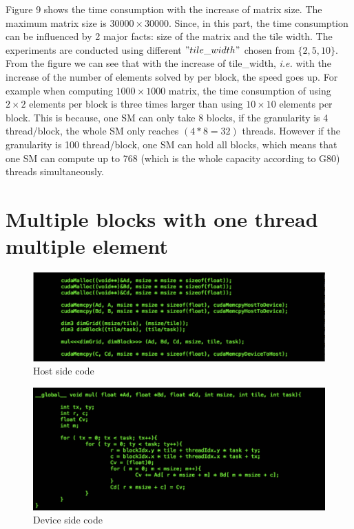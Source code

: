 \documentclass {article}
\begin{document}
Figure 9 shows the time consumption with the increase of matrix size. The maximum matrix size is $30000\times 30000$. Since, in this part, the time consumption can be influenced by 2 major facts: size of the matrix and the tile width. The experiments are conducted using different $"tile\_width"$ chosen from $\{2, 5, 10\}$. From the figure we can see that with the increase of tile\_width, \textit{i.e.} with the increase of the number of elements solved by per block, the speed goes up. For example when computing $1000 \times 1000$ matrix, the time consumption of using $2\times2$ elements per block is three times larger than using $10\times10$ elements per block. This is because, one SM can only take 8 blocks, if the granularity is 4 thread/block, the whole SM only reaches $(4 * 8 = 32)$ threads. However if the granularity is 100 thread/block, one SM can hold all blocks, which means that one SM can compute up to 768 (which is the whole capacity according to G80) threads simultaneously.
\section{Multiple blocks with one thread multiple element}

\begin{figure}[htp!]
\centering
\includegraphics[width = \linewidth]{gpu31.pdf}
\caption{Host side code}
\label{fig:gpu31}
\end{figure}

\begin{figure}[htp!]
\centering
\includegraphics[width = \linewidth]{gpu32.pdf}
\caption{Device side code}
\label{fig:gpu32}
\end{figure}
\end{document}
